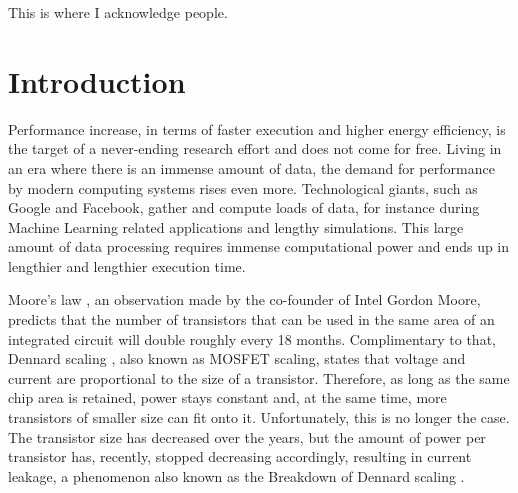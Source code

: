 \documentclass[]{usiinfthesis}
\begin{document}


\begin{acknowledgements}
This is where I acknowledge people.

\end{acknowledgements}

\tableofcontents 

\mainmatter

%
%
%  
%
%
%

\chapter*{Introduction}

Performance increase, in terms of faster execution and higher energy efficiency, 
is the target of a never-ending research effort and does not come for free.
Living in an era where there is an immense amount of data, the demand for %
performance by modern computing systems rises even more.
Technological giants, such as Google and Facebook, gather and compute loads of data, for instance 
during Machine Learning related applications and lengthy simulations. This large amount of data
processing requires immense computational power and ends up in lengthier and lengthier execution
 time.\par

Moore's law \cite{schaller1997moore}, an observation made by the co-founder of Intel Gordon Moore, 
predicts that the number of transistors that can be used in the same area of an integrated 
circuit will double roughly every 18 months. Complimentary to that, Dennard scaling 
\cite{dennard1974design}, 
also known as MOSFET scaling, states that voltage and current are 
proportional to the size of a transistor. Therefore, as long as the same chip area is retained, 
power stays constant and, at the same time, more transistors of smaller size can fit onto it.
Unfortunately, this is no longer the case. The transistor size has decreased over 
the years, but the amount of power per transistor has, recently, stopped decreasing accordingly,  
resulting in current leakage, a phenomenon also known as the 
Breakdown of Dennard scaling \cite{esmaeilzadeh2011dark}.\par
\end{document}
